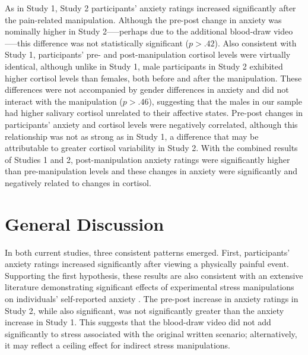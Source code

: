 \documentclass[review]{elsarticle}\usepackage[]{graphicx}\usepackage[]{color}
\begin{document}
As in Study 1, Study 2 participants' anxiety ratings increased significantly after the pain-related manipulation.
Although the pre-post change in anxiety was nominally higher in Study 2—--perhaps due to the additional blood-draw video—--this difference was not statistically significant ($p > .42$).
Also consistent with Study 1, participants' pre- and post-manipulation cortisol levels were virtually identical, although unlike in Study 1, male participants in Study 2 exhibited higher cortisol levels than females, both before and after the manipulation.
These differences were not accompanied by gender differences in anxiety and did not interact with the manipulation ($p > .46$), suggesting that the males in our sample had higher salivary cortisol unrelated to their affective states.
Pre-post changes in participants' anxiety and cortisol levels were negatively correlated, although this relationship was not as strong as in Study 1, a difference that may be attributable to greater cortisol variability in Study 2.
With the combined results of Studies 1 and 2, post-manipulation anxiety ratings were significantly higher than pre-manipulation levels and these changes in anxiety were significantly and negatively related to changes in cortisol.



\section*{General Discussion} %
\label{sec:discussiong}

In both current studies, three consistent patterns emerged.
First, participants' anxiety ratings increased significantly after viewing a physically painful event.
Supporting the first hypothesis, these results are also consistent with an extensive literature demonstrating significant effects of experimental stress manipulations on individuals' self-reported anxiety \cite{turner2010sex,gunnar2009stressor,harrell1996situational,walco2005procedural}.
The pre-post increase in anxiety ratings in Study 2, while also significant, was not significantly greater than the anxiety increase in Study 1. This suggests that the blood-draw video did not add significantly to stress associated with the original written scenario; alternatively, it may reflect a ceiling effect for indirect stress manipulations.
\end{document}
